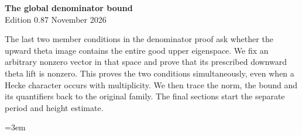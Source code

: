 \begin{center}
{\Large\bfseries The global denominator bound}\\[4pt]
Edition 0.87  November 2026
\end{center}

The last two member conditions in the denominator proof ask whether
the upward theta image contains the entire good upper eigenspace.
We fix an arbitrary nonzero vector in that space and prove that its
prescribed downward theta lift is nonzero. This proves the two
conditions simultaneously, even when a Hecke character occurs with
multiplicity. We then trace the norm, the bound and its quantifiers
back to the original family. The final sections start the separate
period and height estimate.

\begingroup\emergencystretch=3em









\endgroup
